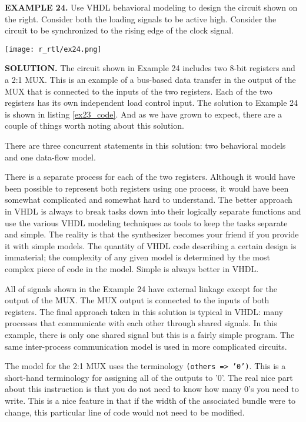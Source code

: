 \begin{leftbar}
\begin{minipage}[t]{0.5\textwidth}
\vspace{10pt}
\noindent
\textbf{EXAMPLE 24.}
Use VHDL behavioral modeling to design the circuit shown on the right. Consider both the loading signals to be active high. Consider the circuit to be synchronized to the rising edge of the clock signal. 
\end{minipage}
\begin{minipage}[t]{0.5\textwidth}
\vspace{0pt}\raggedright
    \centering
	\texttt{[image: r\_rtl/ex24.png]}
\end{minipage}
\end{leftbar}
\noindent
\textbf{SOLUTION.} The circuit shown in Example 24 includes two 8-bit registers and a 2:1 MUX. This is an example of a bus-based data transfer in the output of the MUX that is connected to the inputs of the two registers. Each of the two registers has its own independent load control input. The solution to Example 24 is shown in listing \ref{ex23_code}. And as we have grown to expect, there are a couple of things worth noting about this solution. 
\begin{my_list}
\item There are three concurrent statements in this solution: two behavioral models and one data-flow model. 

\item There is a separate process for each of the two registers. Although it would have been possible to represent both registers using one process, it would have been somewhat complicated and somewhat hard to understand. The better approach in VHDL is always to break tasks down into their logically separate functions and use the various VHDL modeling techniques as tools to keep the tasks separate and simple. The reality is that the synthesizer becomes your friend if you provide it with simple models. The quantity of VHDL code describing a certain design is immaterial; the complexity of any given model is determined by the most complex piece of code in the model. Simple is always better in VHDL.

\item All of signals shown in the Example 24 have external linkage except for the output of the MUX. The MUX output is connected to the inputs of both registers. The final approach taken in this solution is typical in VHDL: many processes that communicate with each other through shared signals. In this example, there is only one shared signal but this is a fairly simple program. The same inter-process communication model is used in more complicated circuits.

\item The model for the 2:1 MUX uses the terminology \texttt{(others => '0')}. This is a short-hand terminology for assigning all of the outputs to '0'. The real nice part about this instruction is that you do not need to know how many 0’s you need to write. This is a nice feature in that if the width of the associated bundle were to change, this particular line of code would not need to be modified. 
\end{my_list}


